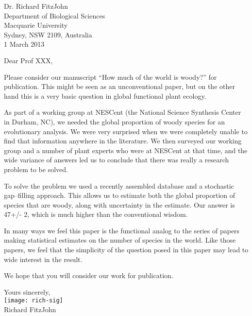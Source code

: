 \documentclass[a4paper,12pt]{article}
\begin{document}
{\raggedleft
  Dr. Richard FitzJohn\\
  Department of Biological Sciences\\
  Macquarie University\\
  Sydney, NSW 2109, Australia\\[2ex]
  1 March 2013\\
}

\vspace{3ex}

Dear Prof XXX,

Please consider our manuscript ``How much of the world is woody?''
for publication.  This might be seen as an unconventional paper, but
on the other hand this is a very basic question in global functional
plant ecology.

As part of a working group at NESCent (the National Science Synthesis
Center in Durham, NC), we needed the global proportion of woody
species for an evolutionary analysis.  We were very surprised when we
were completely unable to find that information anywhere in the
literature.  We then surveyed our working group and a number of plant
experts who were at NESCent at that time, and the wide variance of
answers led us to conclude that there was really a research problem to
be solved.

To solve the problem we used a recently assembled database and a
stochastic gap--filling approach.  This allows us to estimate both the
global proportion of species that are woody, along with uncertainty in
the estimate.  Our answer is 47+/- 2, which is much higher than the
conventional wisdom.

In many ways we feel this paper is the functional analog to the series
of papers making statistical estimates on the number of species in the
world.  Like those papers, we feel that the simplicity of the question
posed in this paper may lead to wide interest in the result.

We hope that you will consider our work for publication.

\vspace{2ex}
\hspace{.2\textwidth}Yours sincerely,\\[2ex]
\hspace*{.2\textwidth}
\texttt{[image: rich-sig]}\\[2ex]
\hspace*{.3\textwidth}
Richard FitzJohn
\end{document}
